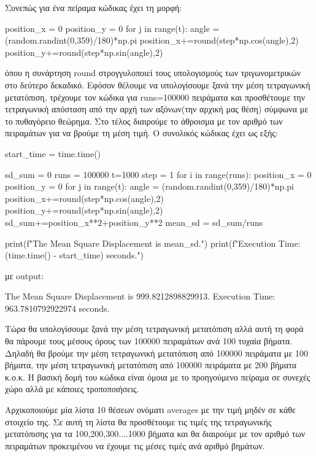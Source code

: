 Συνεπώς για ένα πείραμα κώδικας έχει τη μορφή:
\en 
\begin{python}
position_x = 0
position_y = 0
for j in range(t):
    angle = (random.randint(0,359)/180)*np.pi
    position_x+=round(step*np.cos(angle),2)
    position_y+=round(step*np.sin(angle),2)
\end{python}
\gr όπου η συνάρτηση {\en round} στρογγυλοποιεί τους υπολογισμούς των  τριγωνομετρικών στο δεύτερο δεκαδικό.
Εφόσον θέλουμε να υπολογίσουμε ξανά την μέση τετραγωνική μετατόπιση, τρέχουμε τον κώδικα για {\en runs}=100000 πειράματα και προσθέτουμε την τετραγωνική απόσταση από την αρχή των αξόνων(την αρχική μας θέση) σύμφωνα με το πυθαγόρειο θεώρημα. Στο τέλος διαιρούμε το άθροισμα με τον αριθμό των πειραμάτων για να βρούμε τη μέση τιμή. Ο συνολικός κώδικας έχει ως εξής:
\en
\begin{python}
start_time = time.time()

sd_sum = 0
runs = 100000
t=1000
step = 1
for i in range(runs):
    position_x = 0
    position_y = 0
    for j in range(t):
        angle = (random.randint(0,359)/180)*np.pi
        position_x+=round(step*np.cos(angle),2)
        position_y+=round(step*np.sin(angle),2)
    sd_sum+=position_x**2+position_y**2
mean_sd = sd_sum/runs

print(f"The Mean Square Displacement is {mean_sd}.")
print(f"Execution Time: {(time.time() - start_time)} seconds.")
\end{python}
\gr με \en output:
\begin{python}
The Mean Square Displacement is 999.8212898829913.
Execution Time: 963.7810792922974 seconds.
\end{python}
\gr 
Τώρα θα υπολογίσουμε ξανά την μέση τετραγωνική μετατόπιση αλλά αυτή τη φορά θα πάρουμε τους μέσους όρους των 100000 πειραμάτων ανά 100 τυχαία βήματα. Δηλαδή θα βρούμε την μέση τετραγωνική μετατόπιση από 100000 πειράματα με 100 βήματα, την μέση τετραγωνική μετατόπιση από 100000 πειράματα με 200 βήματα κ.ο.κ. Η βασική δομή του κώδικα είναι όμοια με το προηγούμενο πείραμα σε συνεχές χώρο αλλά με κάποιες τροποποιήσεις.

 Αρχικοποιούμε μία λίστα 10 θέσεων ονόματι {\en averages} με την τιμή μηδέν σε κάθε στοιχείο της. Σε αυτή τη λίστα θα προσθέτουμε τις τιμές της τετραγωνικής μετατόπισης για τα 100,200,300....1000 βήματα και θα διαιρούμε με τον αριθμό των πειραμάτων προκειμένου να έχουμε τις μέσες τιμές ανά αριθμό βημάτων.
 

